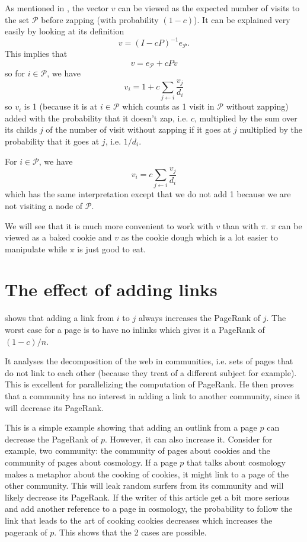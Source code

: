 \documentclass{article}
\newcommand{\1}{\mathbf{1}}
\theoremstyle{definition}
\begin{document}
As mentioned in \cite{de2008maximizing}, the vector \(v\) can be viewed as the expected number of visits to the set \(\mathcal{P}\) before zapping (with probability \((1-c)\)).
It can be explained very easily by looking at its definition
\[ v = (I - cP)^{-1} e_{\mathcal{P}}. \]
This implies that
\[ v = e_{\mathcal{P}} + cPv \]
so for \(i \in \mathcal{P}\), we have
\[ v_i = 1 + c \sum_{j \leftarrow i} \frac{v_j}{d_i} \]
so \(v_i\) is 1 (because it is at \(i \in \mathcal{P}\) which counts as 1 visit in \(\mathcal{P}\) without zapping)
added with the probability that it doesn't zap, i.e. \(c\), multiplied by the sum over its childs \(j\) of the number of visit without zapping if it goes at \(j\) multiplied
by the probability that it goes at \(j\), i.e. \(1/d_i\).

For \(i \in \mathcal{P}\), we have
\[ v_i = c \sum_{j \leftarrow i} \frac{v_j}{d_i} \]
which has the same interpretation except that we do not add 1 because we are not visiting a node of \(\mathcal{P}\).

We will see that it is much more convenient to work with \(v\) than with \(\pi\).
\(\pi\) can be viewed as a baked cookie and \(v\) as the cookie dough which is a lot easier to manipulate
while \(\pi\) is just good to eat.

\section{The effect of adding links}
\cite{avrachenkov2004decomposition} shows that adding a link
from \(i\) to \(j\) always increases the PageRank of \(j\).
The worst case for a page is to have no inlinks which gives it a PageRank of \((1-c)/n\).

It analyses the decomposition of the web in communities, i.e.
sets of pages that do not link to each other (because they treat of a different subject for example).
This is excellent for parallelizing the computation of PageRank.
He then proves that a community has no interest in adding a link to another community, since it will decrease its PageRank.

This is a simple example showing that adding an outlink from a page \(p\) can decrease the PageRank of \(p\).
However, it can also increase it.
Consider for example, two community: the community of pages about cookies and the community of pages about cosmology.
If a page \(p\) that talks about cosmology makes a metaphor about the cooking of cookies, it might link to a page of the other community.
This will leak random surfers from its community and will likely decrease its PageRank.
If the writer of this article get a bit more serious and add another reference to a page in cosmology, the probability to follow the link that leads to the art of cooking cookies decreases which increases the pagerank of \(p\).
This shows that the 2 cases are possible.
\end{document}
